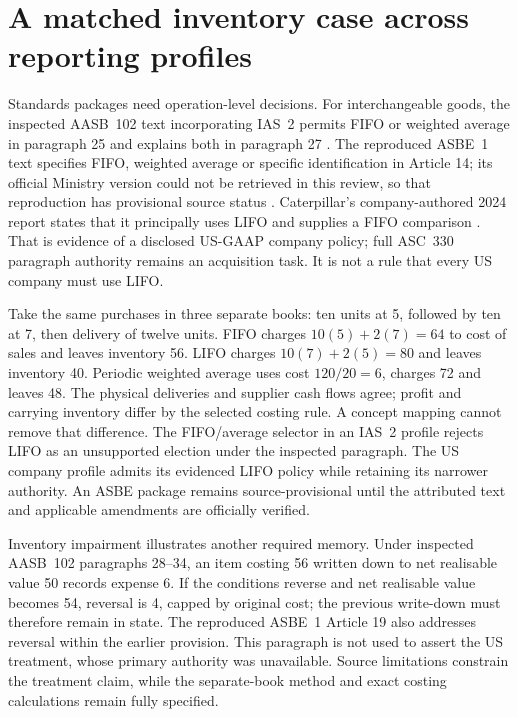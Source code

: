 \section{A matched inventory case across reporting profiles}

Standards packages need operation-level decisions. For interchangeable goods,
the inspected AASB~102 text incorporating IAS~2 permits FIFO or weighted
average in paragraph 25 and explains both in paragraph 27
\citep{aasb102}. The reproduced ASBE~1 text specifies FIFO, weighted average
or specific identification in Article 14; its official Ministry version could
not be retrieved in this review, so that reproduction has provisional source
status \citep{asbe1copy}. Caterpillar's company-authored 2024 report states
that it principally uses LIFO and supplies a FIFO comparison
\citep[Note 1.C]{caterpillar2024}. That is evidence of a disclosed US-GAAP
company policy; full ASC~330 paragraph authority remains an acquisition task.
It is not a rule that every US company must use LIFO.

Take the same purchases in three separate books: ten units at 5, followed by
ten at 7, then delivery of twelve units. FIFO charges $10(5)+2(7)=64$ to
cost of sales and leaves inventory 56. LIFO charges $10(7)+2(5)=80$ and
leaves inventory 40. Periodic weighted average uses cost $120/20=6$, charges
72 and leaves 48. The physical deliveries and supplier cash flows agree;
profit and carrying inventory differ by the selected costing rule. A concept
mapping cannot remove that difference. The FIFO/average selector in an
IAS~2 profile rejects LIFO as an unsupported election under the inspected
paragraph. The US company profile admits its evidenced LIFO policy while
retaining its narrower authority. An ASBE package remains source-provisional
until the attributed text and applicable amendments are officially verified.

Inventory impairment illustrates another required memory. Under inspected
AASB~102 paragraphs 28--34, an item costing 56 written down to net realisable
value 50 records expense 6. If the conditions reverse and net realisable
value becomes 54, reversal is 4, capped by original cost; the previous
write-down must therefore remain in state. The reproduced ASBE~1 Article 19
also addresses reversal within the earlier provision. This paragraph is not
used to assert the US treatment, whose primary authority was unavailable.
Source limitations constrain the treatment claim, while the separate-book
method and exact costing calculations remain fully specified.







